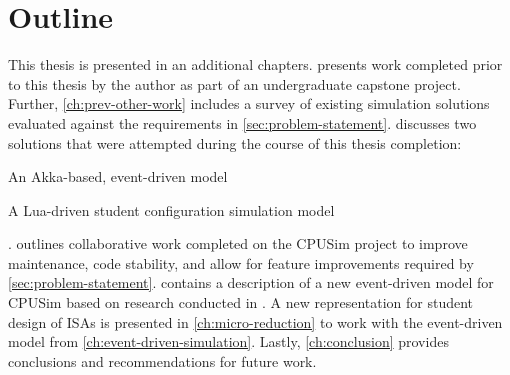 \section{Outline} 

This thesis is presented in an additional  chapters.  presents work completed prior to this thesis by the author as part of an undergraduate capstone project. Further, \cref{ch:prev-other-work} includes a survey of existing simulation solutions evaluated against the requirements in \cref{sec:problem-statement}.  discusses two solutions that were attempted during the course of this thesis completion: 
\begin{enumerate*}
    \item An Akka-based, event-driven model
    \item A Lua-driven student configuration simulation model
\end{enumerate*}. 
 outlines collaborative work completed on the CPUSim project to improve maintenance, code stability, and allow for feature improvements required by \cref{sec:problem-statement}.  contains a description of a new event-driven model for CPUSim based on research conducted in . A new representation for student design of ISAs is presented in \cref{ch:micro-reduction} to work with the event-driven model from \cref{ch:event-driven-simulation}. Lastly, \cref{ch:conclusion} provides conclusions and recommendations for future work. 
